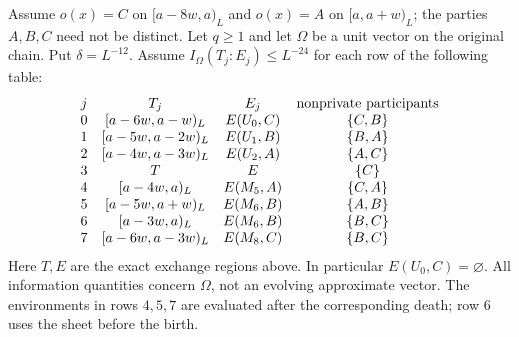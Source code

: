 \begin{lemma}
    \label{thm:chain_one_band_conditional_changes}
    \leanok
    Assume $o(x)=C$ on $\lbrack a-8w,a)_L$ and $o(x)=A$ on $[a,a+w)_L$; the
    parties $A,B,C$ need not be distinct. Let $q\ge1$ and let $\Omega$ be a unit vector on the
    original chain. Put $\delta=L^{-12}$.
    Assume $I_\Omega(T_j:E_j)\le L^{-24}$ for each row of the following table:
    \begin{align}
        \begin{array}{cccc}
            j & T_j           & E_j      & \text{nonprivate participants} \\
            0 & [a-6w,a-w)_L  & E(U_0,C) & \{C,B\}                        \\
            1 & [a-5w,a-2w)_L & E(U_1,B) & \{B,A\}                        \\
            2 & [a-4w,a-3w)_L & E(U_2,A) & \{A,C\}                        \\
            3 & T             & E        & \{C\}                          \\
            4 & [a-4w,a)_L    & E(M_5,A) & \{C,A\}                        \\
            5 & [a-5w,a+w)_L  & E(M_6,B) & \{A,B\}                        \\
            6 & [a-3w,a)_L    & E(M_6,B) & \{B,C\}                        \\
            7 & [a-6w,a-3w)_L & E(M_8,C) & \{B,C\}
        \end{array}\notag
    \end{align}
    Here $T,E$ are the exact exchange regions above. In particular
    $E(U_0,C)=\varnothing$. All information quantities concern $\Omega$,
    not an evolving approximate vector. The environments in rows $4,5,7$
    are evaluated after the corresponding death; row $6$ uses the sheet
    before the birth.


\end{lemma}
